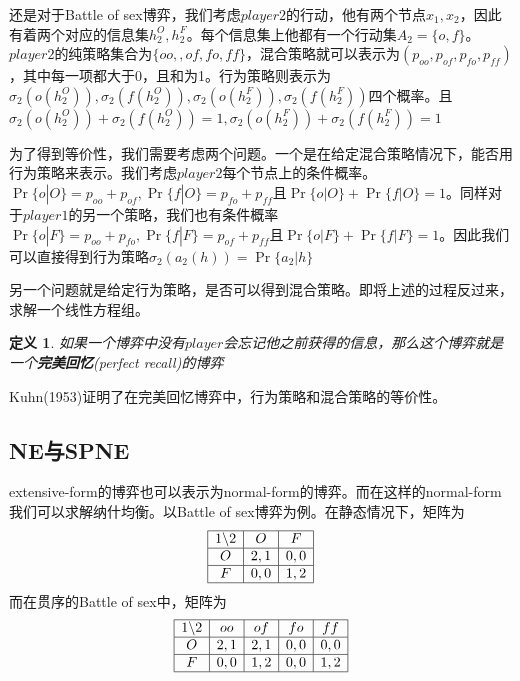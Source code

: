 \documentclass[UTF8,12pt]{ctexart}
\newtheorem{Def}{定义}[section]
\numberwithin{equation}{section} %
\numberwithin{figure}{section}
\numberwithin{table}{section}
\begin{document}
	还是对于Battle of sex博弈，我们考虑$player 2$的行动，他有两个节点$x_1,x_2$，因此有着两个对应的信息集$h_2^O,h_2^F$。每个信息集上他都有一个行动集$A_2 = \{o,f\}$。$player 2$的纯策略集合为$\{oo,,of,fo,ff\}$，混合策略就可以表示为$(p_{oo},p_{of},p_{fo},p_{ff})$，其中每一项都大于0，且和为1。行为策略则表示为$\sigma_2(o(h_2^O)),\sigma_2(f(h_2^O)),\sigma_2(o(h_2^F)),\sigma_2(f(h_2^F))$四个概率。且$\sigma_2(o(h_2^O)) + \sigma_2(f(h_2^O)) = 1,\sigma_2(o(h_2^F)) + \sigma_2(f(h_2^F)) = 1$
	
	为了得到等价性，我们需要考虑两个问题。一个是在给定混合策略情况下，能否用行为策略来表示。我们考虑$player 2$每个节点上的条件概率。$\Pr\{o|O\} = p_{oo} + p_{of},\Pr\{f|O\} = p_{fo} + p_{ff}$且$\Pr\{o|O\} + \Pr\{f|O\} = 1$。同样对于$player 1$的另一个策略，我们也有条件概率$\Pr\{o|F\} = p_{oo} + p_{fo},\Pr\{f|F\} = p_{of} + p_{ff}$且$\Pr\{o|F\} + \Pr\{f|F\} = 1$。因此我们可以直接得到行为策略$\sigma_2(a_2(h)) = \Pr\{a_2|h\}$
	
	另一个问题就是给定行为策略，是否可以得到混合策略。即将上述的过程反过来，求解一个线性方程组。
	
	\begin{Def}
		如果一个博弈中没有$player$会忘记他之前获得的信息，那么这个博弈就是一个\textbf{完美回忆}(perfect recall)的博弈
	\end{Def}
	
	Kuhn(1953)证明了在完美回忆博弈中，行为策略和混合策略的等价性。
	
	\subsection{NE与SPNE}
	
	extensive-form的博弈也可以表示为normal-form的博弈。而在这样的normal-form我们可以求解纳什均衡。以Battle of sex博弈为例。在静态情况下，矩阵为
	\begin{equation}
		\begin{array}{|c|c|c|}
			\hline
			1 \backslash 2 & O & F \\
			\hline
			O & 2,1 & 0,0 \\
			\hline
			F & 0,0 & 1,2 \\
			\hline
		\end{array}
	\end{equation}
	而在贯序的Battle of sex中，矩阵为
	\begin{equation}
		\begin{array}{|c|c|c|c|c|}
			\hline
			1 \backslash 2 & oo & of & fo & ff \\
			\hline
			O & 2,1 & 2,1 & 0,0 & 0,0 \\
			\hline
			F & 0,0 & 1,2 & 0,0 & 1,2 \\
			\hline
		\end{array}
	\end{equation}
	
\end{document}

